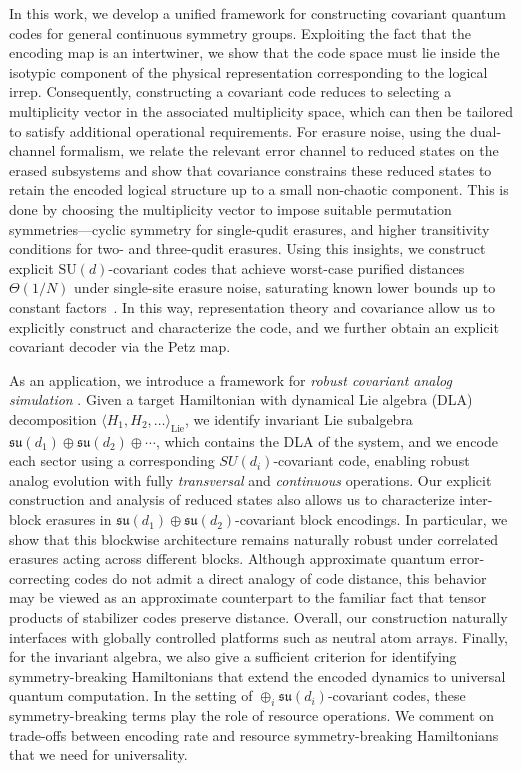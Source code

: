 \documentclass[twocolumn,superscriptaddress,aps,showpacs,amsmath,amstex,amssymb,citeautoscript,floatfix,pra,preprintnumbers]{revtex4-2}
\newcounter{alg}
\theoremstyle{plain}
\theoremstyle{plain}
\theoremstyle{plain}
\theoremstyle{plain}
\theoremstyle{plain}
\theoremstyle{plain}
\begin{document}
In this work, we develop a unified framework for constructing covariant quantum codes for general continuous symmetry groups. Exploiting the fact that the encoding map is an intertwiner, we show that the code space must lie inside the isotypic component of the physical representation corresponding to the logical irrep. Consequently, constructing a covariant code reduces to selecting a multiplicity vector in the associated multiplicity space, which can then be tailored to satisfy additional operational requirements. For erasure noise, using the dual-channel formalism, we relate the relevant error channel to reduced states on the erased subsystems and show that covariance constrains these reduced states to retain the encoded logical structure up to a small non-chaotic component. This is done by choosing the multiplicity vector to impose suitable permutation symmetries—cyclic symmetry for single-qudit erasures, and higher transitivity conditions for two- and three-qudit erasures.
Using this insights, we construct explicit $\mathrm{SU}(d)$-covariant codes that achieve worst-case purified distances $\Theta(1/N)$ under single-site erasure noise, saturating known lower bounds up to constant factors~\cite{Faist2020,Zhou2021}. 
In this way, representation theory and covariance allow us to explicitly construct and characterize the code, and we further obtain an explicit covariant decoder via the Petz map.

As an application, we introduce a framework for \emph{robust covariant analog simulation} . 
Given a target Hamiltonian with dynamical Lie algebra (DLA) decomposition 
$\langle H_1,H_2,\dots\rangle_{\mathrm{Lie}}$, we identify invariant Lie subalgebra $\mathfrak{su}(d_1)\oplus \mathfrak{su}(d_2)\oplus \cdots$, which contains the DLA of the system, and 
we encode each sector using a corresponding $SU(d_i)$-covariant code, enabling robust analog evolution with fully \emph{transversal} and \emph{continuous} operations. Our explicit construction and analysis of reduced states also allows us to characterize inter-block erasures in $\mathfrak{su}(d_1)\oplus \mathfrak{su}(d_2)$-covariant block encodings. In particular, we show that this blockwise architecture remains naturally robust under correlated erasures acting across different blocks. Although approximate quantum error-correcting codes do not admit a direct analogy of code distance, this behavior may be viewed as an approximate counterpart to the familiar fact that tensor products of stabilizer codes preserve distance.
Overall, our construction naturally interfaces with globally controlled platforms such as neutral atom arrays. 
Finally, for the invariant algebra, we also give a sufficient criterion for identifying symmetry-breaking Hamiltonians that extend the encoded dynamics to universal quantum computation. In the setting of $\oplus_i \mathfrak{su}(d_i)$-covariant codes, these symmetry-breaking terms play the role of resource operations. We comment on trade-offs between encoding rate and resource symmetry-breaking Hamiltonians that we need for universality.
\end{document}
